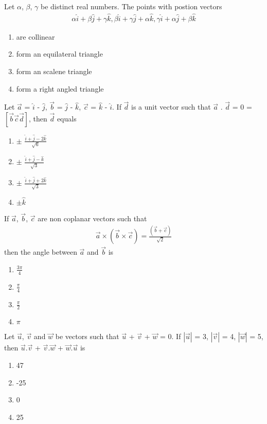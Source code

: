 \item Let $\alpha$, $\beta$, $\gamma$ be distinct real numbers. The points with postion vectors 
\begin{align*}
\alpha \hat{i} + \beta \hat{j} + \gamma \hat{k}, \beta \hat{i} + \gamma \hat{j} + \alpha \hat{k}, 
\gamma \hat{i} + \alpha \hat{j} + \beta \hat{k}
\end{align*}
\begin{enumerate}
\item are collinear
\item form an equilateral triangle
\item form an scalene triangle
\item form a right angled triangle
\end{enumerate}

\item Let $\overrightarrow{a}$ = $\hat{i}$ - $\hat{j}$, $\overrightarrow{b}$ = $\hat{j}$ - $\hat{k}$, 
$\overrightarrow{c}$ = $\hat{k}$ - $\hat{i}$. If $\overrightarrow{d}$ is a unit vector such that 
$\overrightarrow{a}$ . $\overrightarrow{d}$ = 0 = $[\overrightarrow{b} \overrightarrow{c} \overrightarrow{d}]$, then $\overrightarrow{d}$ equals
\begin{enumerate}
\item $\pm$ $\frac{\hat{i} + \hat{j} - 2\hat{k}}{\sqrt{6}}$
\item $\pm$ $\frac{\hat{i} + \hat{j} - \hat{k}}{\sqrt{3}}$
\item $\pm$ $\frac{\hat{i} + \hat{j} + 2\hat{k}}{\sqrt{3}}$
\item $\pm \hat{k}$
\end{enumerate}

\item If $\overrightarrow{a}$, $\overrightarrow{b}$, $\overrightarrow{c}$ are non coplanar vectors such that 
\begin{align*}
\overrightarrow{a} \times (\overrightarrow{b} \times \overrightarrow{c}) = \frac{(\overrightarrow{b} + \overrightarrow{c})}{\sqrt{2}}
\end{align*}
then the angle between $\overrightarrow{a}$ and $\overrightarrow{b}$ is
\begin{enumerate}
\item $\frac{3\pi}{4}$
\item $\frac{\pi}{4}$
\item $\frac{\pi}{2}$
\item $\pi$
\end{enumerate}

\item Let $\overrightarrow{u}$, $\overrightarrow{v}$ and $\overrightarrow{w}$ be vectors such that $\overrightarrow{u}$ + $\overrightarrow{v}$ + $\overrightarrow{w}$ = 0. If $|\overrightarrow{u}|$ = 3, $|\overrightarrow{v}|$ = 4, $|\overrightarrow{w}|$ = 5, then $\overrightarrow{u}.\overrightarrow{v}$  + $\overrightarrow{v}.\overrightarrow{w}$ + $\overrightarrow{w}.\overrightarrow{u}$ is
\begin{enumerate}
\item 47
\item -25
\item 0
\item 25
\end{enumerate}

